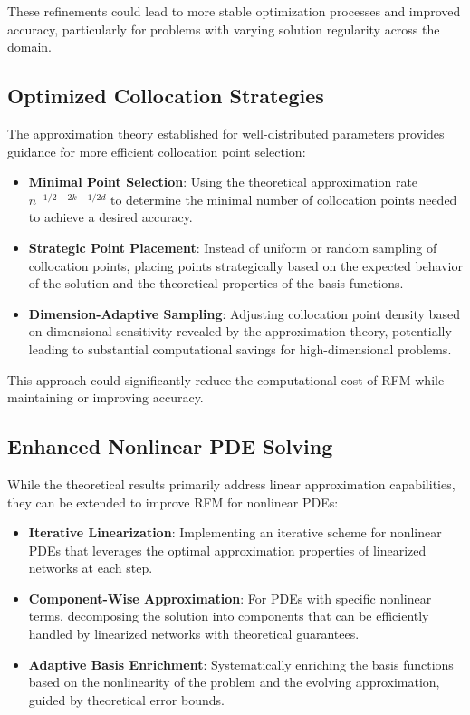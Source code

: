 \documentclass[11pt]{article}
\begin{document}
These refinements could lead to more stable optimization processes and improved accuracy, particularly for problems with varying solution regularity across the domain.

\subsection{Optimized Collocation Strategies}

The approximation theory established for well-distributed parameters provides guidance for more efficient collocation point selection:

\begin{itemize}
    \item \textbf{Minimal Point Selection}: Using the theoretical approximation rate $n^{-1/2-2k+1/2d}$ to determine the minimal number of collocation points needed to achieve a desired accuracy.
    
    \item \textbf{Strategic Point Placement}: Instead of uniform or random sampling of collocation points, placing points strategically based on the expected behavior of the solution and the theoretical properties of the basis functions.
    
    \item \textbf{Dimension-Adaptive Sampling}: Adjusting collocation point density based on dimensional sensitivity revealed by the approximation theory, potentially leading to substantial computational savings for high-dimensional problems.
\end{itemize}

This approach could significantly reduce the computational cost of RFM while maintaining or improving accuracy.

\subsection{Enhanced Nonlinear PDE Solving}

While the theoretical results primarily address linear approximation capabilities, they can be extended to improve RFM for nonlinear PDEs:

\begin{itemize}
    \item \textbf{Iterative Linearization}: Implementing an iterative scheme for nonlinear PDEs that leverages the optimal approximation properties of linearized networks at each step.
    
    \item \textbf{Component-Wise Approximation}: For PDEs with specific nonlinear terms, decomposing the solution into components that can be efficiently handled by linearized networks with theoretical guarantees.
    
    \item \textbf{Adaptive Basis Enrichment}: Systematically enriching the basis functions based on the nonlinearity of the problem and the evolving approximation, guided by theoretical error bounds.
\end{itemize}
\end{document}
